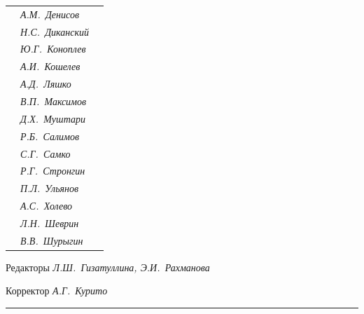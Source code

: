 \begin{tabular}{p{63mm}p{40mm}p{50mm}}
                               &   \it А.М.~Денисов & \\


                               &   \it Н.С.~Диканский & \\


                               &   \it Ю.Г.~Коноплев & \\


                               &   \it А.И.~Кошелев  & \\


                               &   \it А.Д.~Ляшко  & \\


                               &   \it В.П.~Максимов  & \\


                               &   \it Д.Х.~Муштари & \\


                               &   \it Р.Б.~Салимов  & \\


                               &   \it С.Г.~Самко  & \\


                               &   \it Р.Г.~Стронгин  & \\


                               &   \it П.Л.~Ульянов  & \\


                               &   \it А.С.~Холево  & \\


                               &   \it Л.Н.~Шеврин  & \\


                               &   \it В.В.~Шурыгин  & \\


\end{tabular} 


\bigskip 


\bigskip 


\bigskip 





 


\centerline{Редакторы \it Л.Ш.~Гизатуллина, Э.И.~Рахманова}


\centerline{Корректор \it А.Г.~Курито}


\bigskip 


\hrule 



